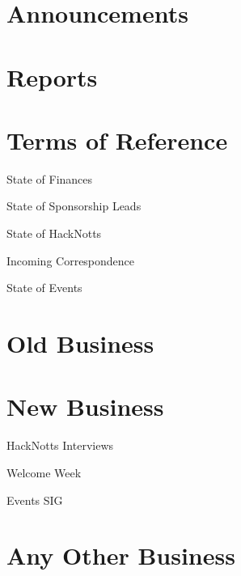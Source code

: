\documentclass[11pt,hacksoc,agenda]{meetingmins}
\begin{document}
\maketitle

\section{Announcements}

\section{Reports}

\section{Terms of Reference}
\begin{items}
\item {State of Finances}
\item {State of Sponsorship Leads}
\item {State of HackNotts}
\item {Incoming Correspondence}
\item {State of Events}
\end{items}

\section{Old Business}

\section{New Business}
\begin{items}
\item {HackNotts Interviews}
\item {Welcome Week}
\item {Events SIG}
\end{items}

\section{Any Other Business}

\vspace{1em}
\end{document}
